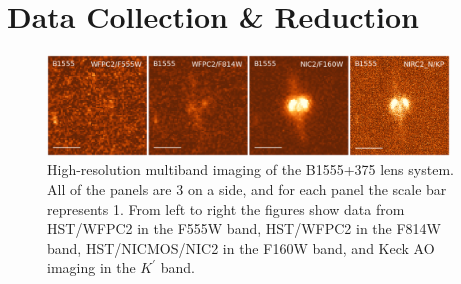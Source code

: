 \documentclass[useAMS,usenatbib]{mn2e}
\begin{document}

\section{Data Collection \& Reduction}

\begin{figure}
\includegraphics[width=0.95\textwidth]{B1555_gallery.eps}
\caption{High-resolution multiband imaging of the B1555+375 lens system.
All of the panels are 3 on a side, and for each panel the scale bar 
represents 1\arcsec.  From left to right the figures show data from
HST/WFPC2 in the F555W band, HST/WFPC2 in the F814W band, HST/NICMOS/NIC2
in the F160W band, and Keck AO imaging in the $K^\prime$ band.}
%

\end{figure}
\end{document}
